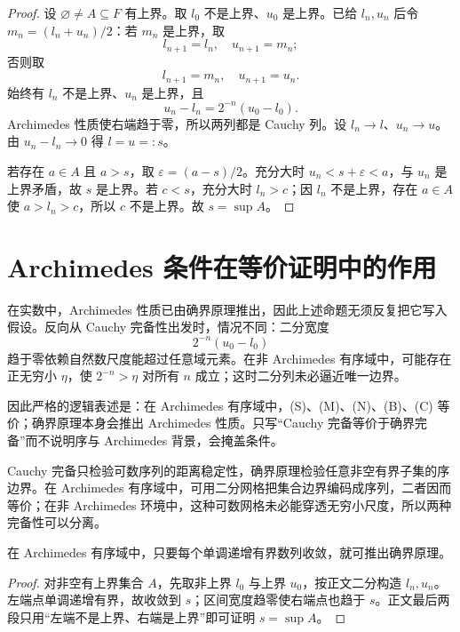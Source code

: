 \begin{proof}
设 \(\varnothing\ne A\subseteq F\) 有上界。取 \(l_0\) 不是上界、\(u_0\) 是上界。已给 \(l_n,u_n\) 后令 \(m_n=(l_n+u_n)/2\)：若 \(m_n\) 是上界，取
\[
 l_{n+1}=l_n,\quad u_{n+1}=m_n;
\]
否则取
\[
 l_{n+1}=m_n,\quad u_{n+1}=u_n.
\]
始终有 \(l_n\) 不是上界、\(u_n\) 是上界，且
\[
 u_n-l_n=2^{-n}(u_0-l_0).
\]
Archimedes 性质使右端趋于零，所以两列都是 Cauchy 列。设 \(l_n\to l\)、\(u_n\to u\)。由 \(u_n-l_n\to0\) 得 \(l=u=:s\)。

若存在 \(a\in A\) 且 \(a>s\)，取 \(\varepsilon=(a-s)/2\)。充分大时 \(u_n<s+\varepsilon<a\)，与 \(u_n\) 是上界矛盾，故 \(s\) 是上界。若 \(c<s\)，充分大时 \(l_n>c\)；因 \(l_n\) 不是上界，存在 \(a\in A\) 使 \(a>l_n>c\)，所以 \(c\) 不是上界。故 \(s=\sup A\)。
\end{proof}

\section{Archimedes 条件在等价证明中的作用}

在实数中，Archimedes 性质已由确界原理推出，因此上述命题无须反复把它写入假设。反向从 Cauchy 完备性出发时，情况不同：二分宽度
\[
 2^{-n}(u_0-l_0)
\]
趋于零依赖自然数尺度能超过任意域元素。在非 Archimedes 有序域中，可能存在正无穷小 \(\eta\)，使 \(2^{-n}>\eta\) 对所有 \(n\) 成立；这时二分列未必逼近唯一边界。

因此严格的逻辑表述是：在 Archimedes 有序域中，(S)、(M)、(N)、(B)、(C) 等价；确界原理本身会推出 Archimedes 性质。只写“Cauchy 完备等价于确界完备”而不说明序与 Archimedes 背景，会掩盖条件。

\begin{remark}[序列完备与序完备]
Cauchy 完备只检验可数序列的距离稳定性，确界原理检验任意非空有界子集的序边界。在 Archimedes 有序域中，可用二分网格把集合边界编码成序列，二者因而等价；在非 Archimedes 环境中，这种可数网格未必能穿透无穷小尺度，所以两种完备性可以分离。
\end{remark}

\begin{proposition}
在 Archimedes 有序域中，只要每个单调递增有界数列收敛，就可推出确界原理。
\end{proposition}

\begin{proof}
对非空有上界集合 \(A\)，先取非上界 \(l_0\) 与上界 \(u_0\)，按正文二分构造 \(l_n,u_n\)。左端点单调递增有界，故收敛到 \(s\)；区间宽度趋零使右端点也趋于 \(s\)。正文最后两段只用“左端不是上界、右端是上界”即可证明 \(s=\sup A\)。
\end{proof}

